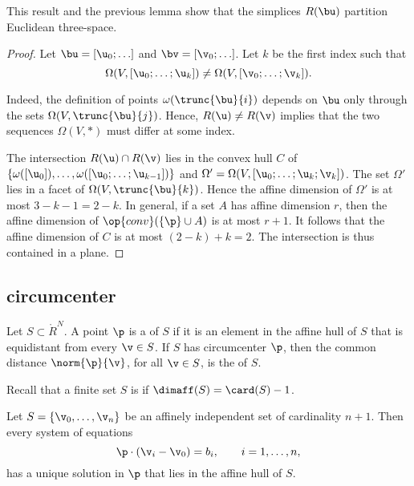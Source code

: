 This result and the previous lemma show that the simplices $R(\bu)$
partition Euclidean three-space.

\begin{proof} Let $\bu = [\u_0;\ldots]$ and $\bv = [\v_0;\ldots]$.  
Let $k$ be the
first index such that
\begin{displaymath} 
\Omega(V,[\u_0;\ldots;\u_{k}]) \ne \Omega(V,[\v_0;\ldots;\v_{k}]).
\end{displaymath}

  Indeed, the definition of points
$\omega(\trunc{\bu}{i})$ depends on $\bu$ only through the sets
$\Omega(V,\trunc{\bu}{j})$.  Hence, $R(\u)\ne R(\v)$ implies that the
two sequences $\Omega(V,*)$ must differ at some index.

The intersection $R(\u)\cap R(\v)$ lies in the convex hull $C$ of
$\{\omega([\u_0]),\ldots,\omega( [\u_0;\ldots; \u_{k-1}])\}$ and
$\Omega'=\Omega(V,[\u_0;\ldots;\u_{k};\v_{k}])$.  The set $\Omega'$
lies in a facet of $\Omega(V,\trunc{\bu}{k})$.  Hence the affine
dimension of $\Omega'$ is at most $3-k-1=2-k$.  In general, if a set
$A$ has affine dimension $r$, then the affine dimension of
$\op{conv}(\{\p\}\cup A)$ is at most $r+1$.  It follows that the
affine dimension of $C$ is at most $(2-k)+ k = 2$.  The intersection
is thus contained in a plane.
\end{proof}


\subsection{circumcenter}

\begin{definition} 
Let $S\subset\ring{R}^N$.  
A point $\p$ is a  of $S$ if it is an element
in the affine hull of $S$ that is equidistant from every $\v\in S$.  If $S$ has
circumcenter $\p$, then the common distance $\norm{\p}{\v}$, for all $\v\in S$,
is the  of  $S$.
\end{definition}

Recall that a finite set $S$
is  if $\dimaff(S) = \card(S) -1$.

\begin{lemma}[]\label{lemma:affine-system} 
Let $S=\{\v_0,\ldots,\v_n\}$ be an affinely independent set of cardinality $n+1$.
Then every system of equations
\begin{displaymath} 
\p \cdot (\v_i - \v_0) = b_i,\qquad i=1,\ldots,n,
\end{displaymath}
has a unique solution in $\p$ that lies in the affine hull of $S$.
\end{lemma}

